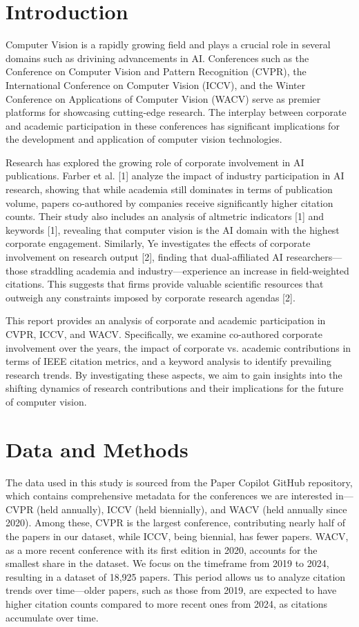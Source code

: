 \documentclass{article}
\begin{document}
\section{Introduction}

Computer Vision is a rapidly growing field and plays a crucial role in several domains such as drivining advancements in AI. Conferences such as the Conference on Computer Vision and Pattern Recognition (CVPR), the International Conference on Computer Vision (ICCV), and the Winter Conference on Applications of Computer Vision (WACV) serve as premier platforms for showcasing cutting-edge research. The interplay between corporate and academic participation in these conferences has significant implications for the development and application of computer vision technologies. 

Research has explored the growing role of corporate involvement in AI publications. Farber et al. [1] analyze the impact of industry participation in AI research, showing that while academia still dominates in terms of publication volume, papers co-authored by companies receive significantly higher citation counts. Their study also includes an analysis of altmetric indicators [1] and keywords [1], revealing that computer vision is the AI domain with the highest corporate engagement. Similarly, Ye investigates the effects of corporate involvement on research output [2], finding that dual-affiliated AI researchers—those straddling academia and industry—experience an increase in field-weighted citations. This suggests that firms provide valuable scientific resources that outweigh any constraints imposed by corporate research agendas [2]. 

This report provides an analysis of corporate and academic participation in CVPR, ICCV, and WACV. Specifically, we examine co-authored corporate involvement over the years, the impact of corporate vs. academic contributions in terms of IEEE citation metrics, and a keyword analysis to identify prevailing research trends. By investigating these aspects, we aim to gain insights into the shifting dynamics of research contributions and their implications for the future of computer vision.

\section{Data and Methods}
The data used in this study is sourced from the Paper Copilot GitHub repository, which contains comprehensive metadata for the conferences we are interested in—CVPR (held annually), ICCV (held biennially), and WACV (held annually since 2020). Among these, CVPR is the largest conference, contributing nearly half of the papers in our dataset, while ICCV, being biennial, has fewer papers. WACV, as a more recent conference with its first edition in 2020, accounts for the smallest share in the dataset. We focus on the timeframe from 2019 to 2024, resulting in a dataset of 18,925 papers. This period allows us to analyze citation trends over time—older papers, such as those from 2019, are expected to have higher citation counts compared to more recent ones from 2024, as citations accumulate over time.
\end{document}
